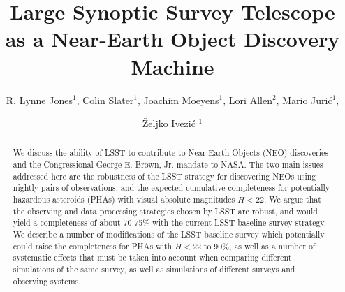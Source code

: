 \documentclass[12pt,preprint]{aastex}
\begin{document}
\title{Large Synoptic Survey Telescope as a Near-Earth Object Discovery Machine}

\author{R. Lynne Jones$^1$, Colin Slater$^1$, Joachim Moeyens$^1$,
Lori Allen$^2$, Mario Juri\'{c}$^1$,  \and \v{Z}eljko Ivezi\'{c} $^1$}


\begin{abstract}
We discuss the ability of LSST to contribute to Near-Earth Objects (NEO) discoveries and
the Congressional George E. Brown, Jr. mandate to NASA. The two main issues addressed
here are the robustness of the LSST strategy for discovering NEOs using nightly pairs of
observations, and the expected cumulative completeness for potentially hazardous asteroids
(PHAs) with visual absolute magnitudes $H<22$.  We argue that the observing and data
processing strategies chosen by LSST are robust, and would yield a completeness of about
70-75\% with the current LSST baseline survey strategy. We describe a number of modifications of the
LSST baseline survey which potentially could raise the completeness for PHAs with $H<22$
to 90\%, as well as a number of systematic effects that must be taken into account when
comparing different simulations of the same survey, as well as simulations of different
surveys and observing systems.
\end{abstract}














\appendix


% 


\end{document}
